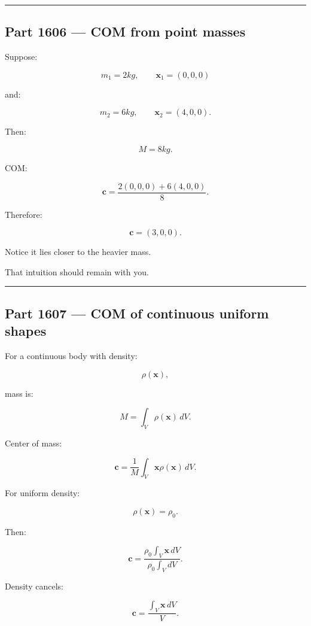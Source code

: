 \begin{center}\rule{0.5\linewidth}{0.5pt}\end{center}

\subsection{Part 1606 --- COM from point masses}\label{06-engine-ii-ch034-part-1606-com-from-point-masses}

Suppose:

\[
m_1=2kg,\qquad
\mathbf{x}_1=(0,0,0)
\]

and:

\[
m_2=6kg,\qquad
\mathbf{x}_2=(4,0,0).
\]

Then:

\[
M=8kg.
\]

COM:

\[
\mathbf{c}
=
\frac{
2(0,0,0)+6(4,0,0)
}{8}.
\]

Therefore:

\[
\boxed{
\mathbf{c}=(3,0,0).
}
\]

Notice it lies closer to the heavier mass.

That intuition should remain with you.

\begin{center}\rule{0.5\linewidth}{0.5pt}\end{center}

\subsection{Part 1607 --- COM of continuous uniform shapes}\label{06-engine-ii-ch034-part-1607-com-of-continuous-uniform-shapes}

For a continuous body with density:

\[
\rho(\mathbf{x}),
\]

mass is:

\[
M
=
\int_V
\rho(\mathbf{x})\,dV.
\]

Center of mass:

\[
\boxed{
\mathbf{c}
=
\frac{1}{M}
\int_V
\mathbf{x}\rho(\mathbf{x})\,dV.
}
\]

For uniform density:

\[
\rho(\mathbf{x})=\rho_0.
\]

Then:

\[
\mathbf{c}
=
\frac{
\rho_0\int_V\mathbf{x}\,dV
}{
\rho_0\int_VdV
}.
\]

Density cancels:

\[
\mathbf{c}
=
\frac{
\int_V\mathbf{x}\,dV
}{
V
}.
\]

